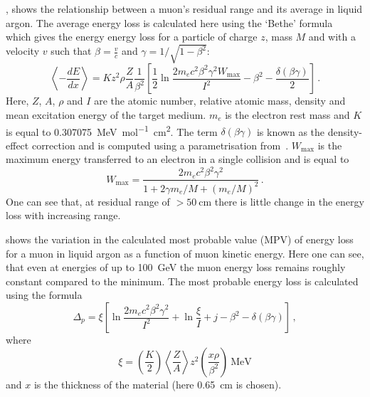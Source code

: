 , shows the relationship between a muon's residual range and its average \dedx in liquid argon.
The average energy loss is calculated here using the `Bethe' formula~\cite{pdg2018} which gives the energy energy loss for a particle of charge $z$, mass $M$ and with a velocity $v$ such that $\beta = \frac{v}{c}$ and $\gamma = 1 / \sqrt{1 - \beta^{2}}$:
\begin{equation}
	\left< -\frac{dE}{dx} \right> = K z^{2} \rho \frac{Z}{A} \frac{1}{\beta^{2}} 
	\left[ \frac{1}{2} \ln \frac{2m_{e}c^{2} \beta^{2} \gamma^{2} W_{\text{max}}}{I^{2}} - \beta^{2} - \frac{\delta (\beta \gamma)}{2} \right] \, .
\end{equation}
Here, $Z$, $A$, $\rho$ and $I$ are the atomic number, relative atomic mass, density and mean excitation energy of the target medium.
$m_{e}$ is the electron rest mass and $K$ is equal to \SI{0.307075}{\MeV\per\mole\square\cm}.
The term $\delta(\beta\gamma)$ is known as the density-effect correction and is computed using a parametrisation from~\cite{densityEffect}.
$W_{\text{max}}$ is the maximum energy transferred to an electron in a single collision and is equal to 
\begin{equation}
	W_{\text{max}} =  \frac{ 2 m_{e} c^{2} \beta^{2} \gamma^{2} }{ 1 + 2\gamma m_{e}/M + (m_{e}/M)^{2} } \, .
\end{equation}
One can see that, at residual range of $>\SI{50}{\cm}$ there is little change in the energy loss with increasing range.

 shows the variation in the calculated most probable value (MPV) of energy loss for a muon in liquid argon as a function of muon kinetic energy.
Here one can see, that even at energies of up to \SI{100}{\GeV} the muon energy loss remains roughly constant compared to the minimum.
The most probable energy loss is calculated using the formula~\cite{mpvELoss}
\begin{equation}
	\Delta_{p} = \xi \left[ \ln \frac{2m_{e}c^{2} \beta^{2} \gamma^{2}}{I^{2}} +
	\ln \frac{\xi}{I} + j - \beta^{2} - \delta(\beta\gamma) \right] \, ,
\end{equation}
where 
\begin{equation}
	\xi = \left( \frac{K}{2} \right) \left< \frac{Z}{A} \right> z^{2} \left( \frac{x\rho}{\beta^{2}} \right)~\text{MeV}
\end{equation}
and $x$ is the thickness of the material (here \SI{0.65}{\cm} is chosen).

